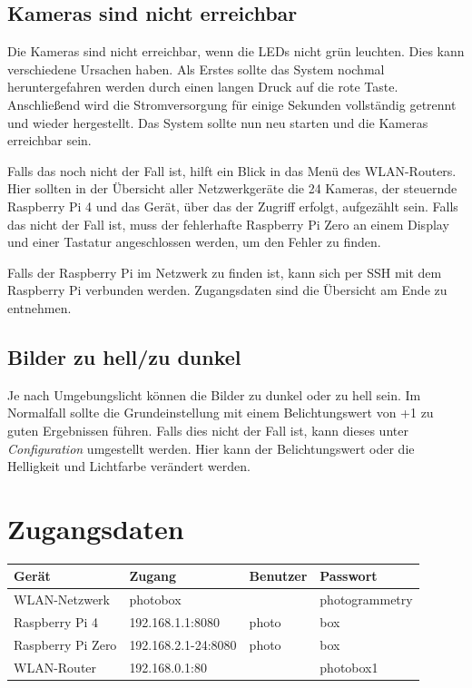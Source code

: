 \documentclass[./00PhotoBox.tex]{subfiles}
\begin{document}
\subsection{Kameras sind nicht erreichbar}
Die Kameras sind nicht erreichbar, wenn die LEDs nicht grün leuchten. Dies kann verschiedene Ursachen haben. Als Erstes sollte das System nochmal heruntergefahren werden durch einen langen Druck auf die rote Taste. Anschließend wird die Stromversorgung für einige Sekunden vollständig getrennt und wieder hergestellt. Das System sollte nun neu starten und die Kameras erreichbar sein.

Falls das noch nicht der Fall ist, hilft ein Blick in das Menü des WLAN-Routers. Hier sollten in der Übersicht aller Netzwerkgeräte die 24 Kameras, der steuernde Raspberry Pi 4 und das Gerät, über das der Zugriff erfolgt, aufgezählt sein. Falls das nicht der Fall ist, muss der fehlerhafte Raspberry Pi Zero an einem Display und einer Tastatur angeschlossen werden, um den Fehler zu finden.

Falls der Raspberry Pi im Netzwerk zu finden ist, kann sich per SSH mit dem Raspberry Pi verbunden werden. Zugangsdaten sind die Übersicht am Ende zu entnehmen.

\subsection{Bilder zu hell/zu dunkel}
Je nach Umgebungslicht können die Bilder zu dunkel oder zu hell sein. Im Normalfall sollte die Grundeinstellung mit einem Belichtungswert von +1 zu guten Ergebnissen führen. Falls dies nicht der Fall ist, kann dieses unter \textit{\foreignlanguage{british}{Configuration}} umgestellt werden. Hier kann der Belichtungswert oder die Helligkeit und Lichtfarbe verändert werden.


\section{Zugangsdaten}

\begin{tabular}{|l|l|l|l|}
    \hline
    \textbf{Gerät}    & \textbf{Zugang}     & \textbf{Benutzer} & \textbf{Passwort} \\
    \hline
    WLAN-Netzwerk     & photobox            &                   & photogrammetry    \\
    \hline
    Raspberry Pi 4    & 192.168.1.1:8080    & photo             & box               \\
    \hline
    Raspberry Pi Zero & 192.168.2.1-24:8080 & photo             & box               \\
    \hline
    WLAN-Router       & 192.168.0.1:80      &                   & photobox1         \\
    \hline
\end{tabular}

\end{document}
